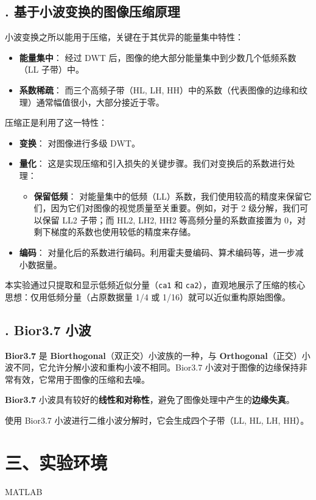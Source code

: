 \documentclass[12pt, a4paper]{article}
\begin{document}
\subsection*{. 基于小波变换的图像压缩原理}
小波变换之所以能用于压缩，关键在于其优异的能量集中特性：
\begin{itemize}
    \item \textbf{能量集中}： 经过 DWT 后，图像的绝大部分能量集中到少数几个低频系数（LL 子带）中。
    \item \textbf{系数稀疏}： 而三个高频子带（HL, LH, HH）中的系数（代表图像的边缘和纹理）通常幅值很小，大部分接近于零。
\end{itemize}
压缩正是利用了这一特性：
\begin{itemize}
    \item \textbf{变换}： 对图像进行多级 DWT。
    \item \textbf{量化}： 这是实现压缩和引入损失的关键步骤。我们对变换后的系数进行处理：
    \begin{itemize}
        \item \textbf{保留低频}： 对能量集中的低频（LL）系数，我们使用较高的精度来保留它们，因为它们对图像的视觉质量至关重要。例如，对于 2 级分解，我们可以保留 LL2 子带；而 HL2, LH2, HH2 等高频分量的系数直接置为 0，对剩下梯度的系数也使用较低的精度来存储。
    \end{itemize}
    \item \textbf{编码}： 对量化后的系数进行编码。利用霍夫曼编码、算术编码等，进一步减小数据量。
\end{itemize}
本实验通过只提取和显示低频近似分量（\texttt{ca1} 和 \texttt{ca2}），直观地展示了压缩的核心思想：仅用低频分量（占原数据量 1/4 或 1/16）就可以近似重构原始图像。

\subsection*{. Bior3.7 小波}
\textbf{Bior3.7} 是 \textbf{Biorthogonal}（双正交）小波族的一种，与 \textbf{Orthogonal}（正交）小波不同，它允许分解小波和重构小波不相同。Bior3.7 小波对于图像的边缘保持非常有效，它常用于图像的压缩和去噪。

\textbf{Bior3.7} 小波具有较好的\textbf{线性和对称性}，避免了图像处理中产生的\textbf{边缘失真}。

使用 Bior3.7 小波进行二维小波分解时，它会生成四个子带（LL, HL, LH, HH）。

\section*{\centering 三、实验环境}
MATLAB
\end{document}
